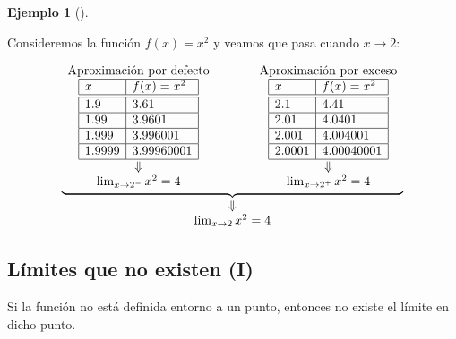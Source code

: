 \documentclass[
  a4paper,
]{scrreport}
\theoremstyle{definition}
\theoremstyle{definition}
\newtheorem{example}{Ejemplo}[chapter]
\theoremstyle{definition}
\theoremstyle{plain}
\theoremstyle{plain}
\theoremstyle{plain}
\theoremstyle{remark}
\begin{document}
\begin{example}[]\protect\hypertarget{exm-limites-aproximados}{}\label{exm-limites-aproximados}

Consideremos la función \(f(x)=x^2\) y veamos que pasa cuando
\(x\to 2\):

\[
\begin{array}{c}
\underbrace{\begin{array}{ccc}
\mbox{Aproximación por defecto} & \qquad & \mbox{Aproximación por exceso}\\
\begin{array}{|l|l|}
\hline
x       & f(x)=x^2   \\
\hline\hline
 1.9    & 3.61       \\
\hline
 1.99   & 3.9601     \\
\hline
 1.999  & 3.996001   \\
\hline
 1.9999 & 3.99960001 \\
\hline
\end{array}
& &
\begin{array}{|l|l|}
\hline
x       & f(x)=x^2   \\
\hline\hline
 2.1    & 4.41       \\
\hline
 2.01   & 4.0401    \\
\hline
 2.001  & 4.004001   \\
\hline
 2.0001 & 4.00040001 \\
\hline
\end{array}\\
\Downarrow & & \Downarrow\\
\lim_{x\to 2^-}x^2=4
& &
\lim_{x\to 2^+}x^2=4
\end{array}}\\
\Downarrow\\
\lim_{x\to 2}x^2=4
\end{array}
\]

\end{example}

\subsection{Límites que no existen
(I)}\label{luxedmites-que-no-existen-i}

Si la función no está definida entorno a un punto, entonces no existe el
límite en dicho punto.
\end{document}
